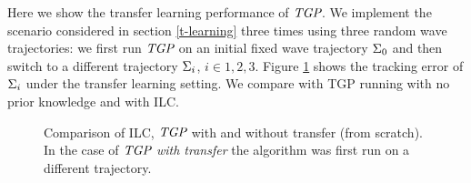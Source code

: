 Here we show the transfer learning performance of $\emph{TGP}$. We implement the scenario considered in section \ref{t-learning} three times using three random wave trajectories: we first run $\emph{TGP}$ on an initial fixed wave trajectory $\Sigma_{0}$ and then switch to a different trajectory $\Sigma_{i}$, $i\in{1,2,3}$. Figure \ref{fig:tlearning} shows the tracking error of $\Sigma_{i}$ under the transfer learning setting. We compare with TGP running with no prior knowledge and with ILC.

\begin{figure}
\center

\caption{Comparison of ILC, $\emph{TGP}$ with and without transfer (from scratch). In the case of \emph{$\emph{TGP}$ with transfer} the algorithm was first run on a different trajectory.}
\label{fig:tlearning}
\end{figure}


